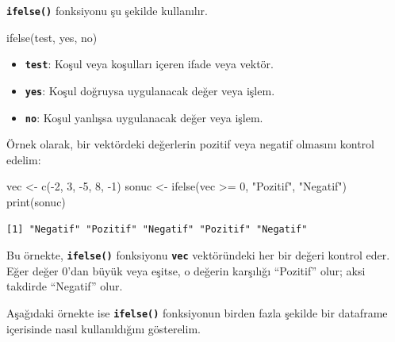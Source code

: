 \documentclass[
  letterpaper,
  DIV=11,
  numbers=noendperiod]{scrreprt}
\newenvironment{Shaded}{\begin{snugshade}}{\end{snugshade}}
\newcommand{\DecValTok}[1]{\textcolor[rgb]{0.68,0.00,0.00}{#1}}
\newcommand{\FunctionTok}[1]{\textcolor[rgb]{0.28,0.35,0.67}{#1}}
\newcommand{\NormalTok}[1]{\textcolor[rgb]{0.00,0.23,0.31}{#1}}
\newcommand{\OtherTok}[1]{\textcolor[rgb]{0.00,0.23,0.31}{#1}}
\newcommand{\SpecialCharTok}[1]{\textcolor[rgb]{0.37,0.37,0.37}{#1}}
\newcommand{\StringTok}[1]{\textcolor[rgb]{0.13,0.47,0.30}{#1}}
\begin{document}
\textbf{\texttt{ifelse()}} fonksiyonu şu şekilde kullanılır.

\begin{Shaded}
\begin{Highlighting}[]
\FunctionTok{ifelse}\NormalTok{(test, yes, no)}
\end{Highlighting}
\end{Shaded}

\begin{itemize}
\item
  \textbf{\texttt{test}}: Koşul veya koşulları içeren ifade veya vektör.
\item
  \textbf{\texttt{yes}}: Koşul doğruysa uygulanacak değer veya işlem.
\item
  \textbf{\texttt{no}}: Koşul yanlışsa uygulanacak değer veya işlem.
\end{itemize}

Örnek olarak, bir vektördeki değerlerin pozitif veya negatif olmasını
kontrol edelim:

\begin{Shaded}
\begin{Highlighting}[]
\NormalTok{vec }\OtherTok{\textless{}{-}} \FunctionTok{c}\NormalTok{(}\SpecialCharTok{{-}}\DecValTok{2}\NormalTok{, }\DecValTok{3}\NormalTok{, }\SpecialCharTok{{-}}\DecValTok{5}\NormalTok{, }\DecValTok{8}\NormalTok{, }\SpecialCharTok{{-}}\DecValTok{1}\NormalTok{)}
\NormalTok{sonuc }\OtherTok{\textless{}{-}} \FunctionTok{ifelse}\NormalTok{(vec }\SpecialCharTok{\textgreater{}=} \DecValTok{0}\NormalTok{, }\StringTok{"Pozitif"}\NormalTok{, }\StringTok{"Negatif"}\NormalTok{)}
\FunctionTok{print}\NormalTok{(sonuc)}
\end{Highlighting}
\end{Shaded}

\begin{verbatim}
[1] "Negatif" "Pozitif" "Negatif" "Pozitif" "Negatif"
\end{verbatim}

Bu örnekte, \textbf{\texttt{ifelse()}} fonksiyonu \textbf{\texttt{vec}}
vektöründeki her bir değeri kontrol eder. Eğer değer 0'dan büyük veya
eşitse, o değerin karşılığı ``Pozitif'' olur; aksi takdirde ``Negatif''
olur.

Aşağıdaki örnekte ise \textbf{\texttt{ifelse()}} fonksiyonun birden
fazla şekilde bir dataframe içerisinde nasıl kullanıldığını gösterelim.
\end{document}
